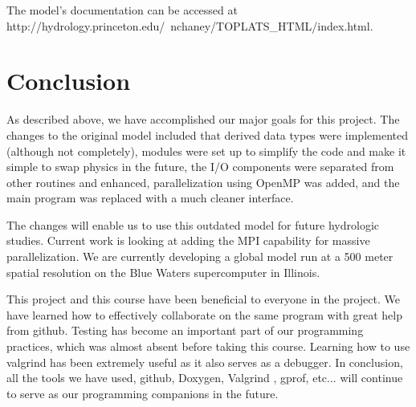 \documentclass[pdftex,12pt,a4paper]{article}
\begin{document}
The model's documentation can be accessed at http://hydrology.princeton.edu/~nchaney/TOPLATS\_HTML/index.html.

\section{Conclusion}

As described above, we have accomplished our major goals for this project. The changes to the original model included that derived data types were implemented (although not completely), modules were set up to simplify the code and make it simple to swap physics in the future, the I/O components were separated from other routines and enhanced, parallelization using OpenMP was added, and the main program was replaced with a much cleaner interface. 

\vspace{1em}

The changes will enable us to use this outdated model for future hydrologic studies. Current work is looking at adding the MPI capability for massive parallelization. We are currently developing a global model run at a 500 meter spatial resolution on the Blue Waters supercomputer in Illinois. 

\vspace{1em}

This project and this course have been beneficial to everyone in the project. We have learned how to effectively collaborate on the same program with great help from github. Testing has become an important part of our programming practices, which was almost absent before taking this course. Learning how to use valgrind has been extremely useful as it also serves as a debugger. In conclusion, all the tools we have used, github, Doxygen, Valgrind , gprof, etc... will continue to serve as our programming companions in the future.
\end{document}
